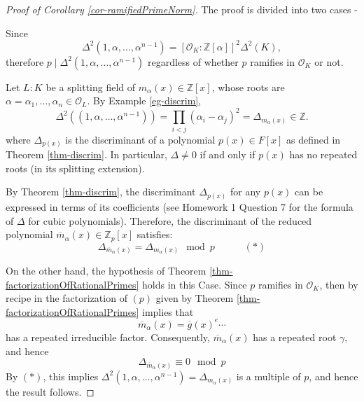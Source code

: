 \begin{proof}[Proof of Corollary \ref{cor-ramifiedPrimeNorm}]
The proof is divided into two cases - 

\medskip
\noindent {} Since
$$
\Delta^2(1,\alpha, \dots, \alpha^{n-1}) = [\mathcal{O}_K : \mathbb{Z}[\alpha]]^2 \Delta^2(K),
$$
therefore 
$p \mid \Delta^2(1,\alpha, \dots, \alpha^{n-1})$ regardless of whether $p$ ramifies in $\mathcal{O}_K$ or not.

\medskip
\noindent {} Let $L:K$ be a splitting field of $m_{\alpha}(x) \in \mathbb{Z}[x]$, whose roots are $\alpha = \alpha_1, \dots, \alpha_n \in \mathcal{O}_L$. 
By Example \ref{eg-discrim}, 
$$\Delta^2((1,\alpha, \dots, \alpha^{n-1})) = \prod_{i < j} (\alpha_i - \alpha_j)^2 = \Delta_{m_{\alpha}(x)} \in \mathbb{Z}.$$
where $\Delta_{p(x)}$ is the discriminant of a polynomial $p(x) \in F[x]$ as defined in Theorem \ref{thm-discrim}. In particular, $\Delta \neq 0$ if and only if $p(x)$ has no repeated roots (in its splitting extension). 

By Theorem \ref{thm-discrim}, the discriminant $\Delta_{p(x)}$ for any $p(x)$ can be expressed in terms of its coefficients (see Homework 1 Question 7 for the formula of $\Delta$ for cubic polynomials). Therefore, the discriminant of the reduced polynomial $\overline{m}_{\alpha}(x) \in \mathbb{Z}_p[x]$ satisfies:
$$\Delta_{\overline{m}_{\alpha}(x)} = \Delta_{m_{\alpha}(x)} \mod{p} \quad \quad \quad (*)$$




On the other hand, the hypothesis of Theorem \ref{thm-factorizationOfRationalPrimes} holds in this Case. Since $p$ ramifies in $ \mathcal{O}_K$, then by recipe in the factorization of $(p)$ given by Theorem \ref{thm-factorizationOfRationalPrimes} implies that 
$$\overline{m}_{\alpha}(x) = \overline{g}(x)^{e} \cdots$$
has a repeated irreducible factor. Consequently, $\overline{m}_{\alpha}(x)$ has a repeated root $\gamma$, and hence
$$\Delta_{\overline{m}_{\alpha}(x)} \equiv 0 \mod p$$
By $(*)$, this implies $\Delta^2(1,\alpha, \dots, \alpha^{n-1}) = \Delta_{m_{\alpha}(x)}$ is a multiple of $p$, and hence the result follows.
\end{proof}


